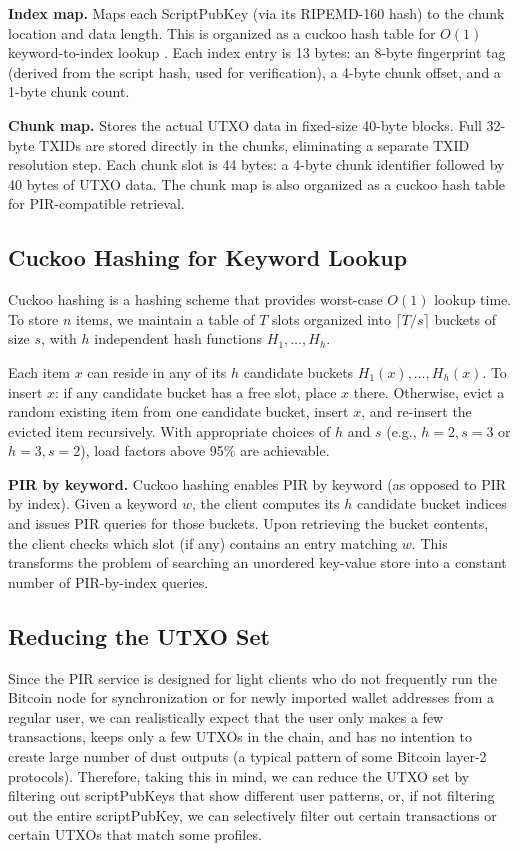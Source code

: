 \textbf{Index map.} Maps each ScriptPubKey (via its RIPEMD-160 hash) to the chunk location and data length. This is organized as a cuckoo hash table for $O(1)$ keyword-to-index lookup \cite{PR01}. Each index entry is 13 bytes: an 8-byte fingerprint tag (derived from the script hash, used for verification), a 4-byte chunk offset, and a 1-byte chunk count.

\textbf{Chunk map.} Stores the actual UTXO data in fixed-size 40-byte blocks. Full 32-byte TXIDs are stored directly in the chunks, eliminating a separate TXID resolution step. Each chunk slot is 44 bytes: a 4-byte chunk identifier followed by 40 bytes of UTXO data. The chunk map is also organized as a cuckoo hash table for PIR-compatible retrieval.

\subsection{Cuckoo Hashing for Keyword Lookup}

Cuckoo hashing \cite{PR01} is a hashing scheme that provides worst-case $O(1)$ lookup time. To store $n$ items, we maintain a table of $T$ slots organized into $\lceil T/s \rceil$ buckets of size $s$, with $h$ independent hash functions $H_1, \ldots, H_h$.

Each item $x$ can reside in any of its $h$ candidate buckets $H_1(x), \ldots, H_h(x)$. To insert $x$: if any candidate bucket has a free slot, place $x$ there. Otherwise, evict a random existing item from one candidate bucket, insert $x$, and re-insert the evicted item recursively. With appropriate choices of $h$ and $s$ (e.g., $h{=}2, s{=}3$ or $h{=}3, s{=}2$), load factors above 95\% are achievable.

\textbf{PIR by keyword.} Cuckoo hashing enables PIR by keyword (as opposed to PIR by index). Given a keyword $w$, the client computes its $h$ candidate bucket indices and issues PIR queries for those buckets. Upon retrieving the bucket contents, the client checks which slot (if any) contains an entry matching $w$. This transforms the problem of searching an unordered key-value store into a constant number of PIR-by-index queries.

\subsection{Reducing the UTXO Set}
\label{sec:extension}

Since the PIR service is designed for light clients who do not frequently run the Bitcoin node for synchronization or for newly imported wallet addresses from a regular user, we can realistically expect that the user only makes a few transactions, keeps only a few UTXOs in the chain, and has no intention to create large number of dust outputs (a typical pattern of some Bitcoin layer-2 protocols). Therefore, taking this in mind, we can reduce the UTXO set by filtering out scriptPubKeys that show different user patterns, or, if not filtering out the entire scriptPubKey, we can selectively filter out certain transactions or certain UTXOs that match some profiles.

